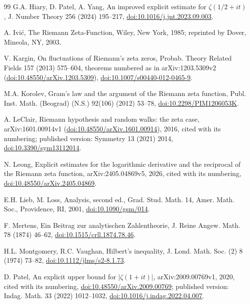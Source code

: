 \documentclass[11pt,a4paper]{article}
\numberwithin{equation}{section}
\theoremstyle{definition}
\theoremstyle{remark}
\begin{document}
\begin{thebibliography}{99}
 G.A. Hiary, D. Patel, A. Yang, An improved explicit estimate for $\zeta(1/2+it)$, J. Number Theory 256 (2024) 195--217, \href{https://doi.org/10.1016/j.jnt.2023.09.003}{doi:10.1016/j.jnt.2023.09.003}.

 A. Ivi\'c, The Riemann Zeta-Function, Wiley, New York, 1985; reprinted by Dover, Mineola, NY, 2003.

 V. Kargin, On fluctuations of Riemann's zeta zeros, Probab. Theory Related Fields 157 (2013) 575--604, theorems numbered as in arXiv:1203.5309v2 (\href{https://doi.org/10.48550/arXiv.1203.5309}{doi:10.48550/arXiv.1203.5309}), \href{https://doi.org/10.1007/s00440-012-0465-9}{doi:10.1007/s00440-012-0465-9}.

 M.A. Korolev, Gram's law and the argument of the Riemann zeta function, Publ. Inst. Math. (Beograd) (N.S.) 92(106) (2012) 53--78, \href{https://doi.org/10.2298/PIM1206053K}{doi:10.2298/PIM1206053K}.

 A. LeClair, Riemann hypothesis and random walks: the zeta case, arXiv:1601.00914v1 (\href{https://doi.org/10.48550/arXiv.1601.00914}{doi:10.48550/arXiv.1601.00914}), 2016, cited with its numbering; published version: Symmetry 13 (2021) 2014, \href{https://doi.org/10.3390/sym13112014}{doi:10.3390/sym13112014}.

 N. Leong, Explicit estimates for the logarithmic derivative and the reciprocal of the Riemann zeta function, arXiv:2405.04869v5, 2026, cited with its numbering, \href{https://doi.org/10.48550/arXiv.2405.04869}{doi:10.48550/arXiv.2405.04869}.

 E.H. Lieb, M. Loss, Analysis, second ed., Grad. Stud. Math. 14, Amer. Math. Soc., Providence, RI, 2001, \href{https://doi.org/10.1090/gsm/014}{doi:10.1090/gsm/014}.

 F. Mertens, Ein Beitrag zur analytischen Zahlentheorie, J. Reine Angew. Math. 78 (1874) 46--62, \href{https://doi.org/10.1515/crll.1874.78.46}{doi:10.1515/crll.1874.78.46}.

 H.L. Montgomery, R.C. Vaughan, Hilbert's inequality, J. Lond. Math. Soc. (2) 8 (1974) 73--82, \href{https://doi.org/10.1112/jlms/s2-8.1.73}{doi:10.1112/jlms/s2-8.1.73}.

 D. Patel, An explicit upper bound for $|\zeta(1+it)|$, arXiv:2009.00769v1, 2020, cited with its numbering, \href{https://doi.org/10.48550/arXiv.2009.00769}{doi:10.48550/arXiv.2009.00769}; published version: Indag. Math. 33 (2022) 1012--1032, \href{https://doi.org/10.1016/j.indag.2022.04.007}{doi:10.1016/j.indag.2022.04.007}.


\end{thebibliography}
\end{document}
